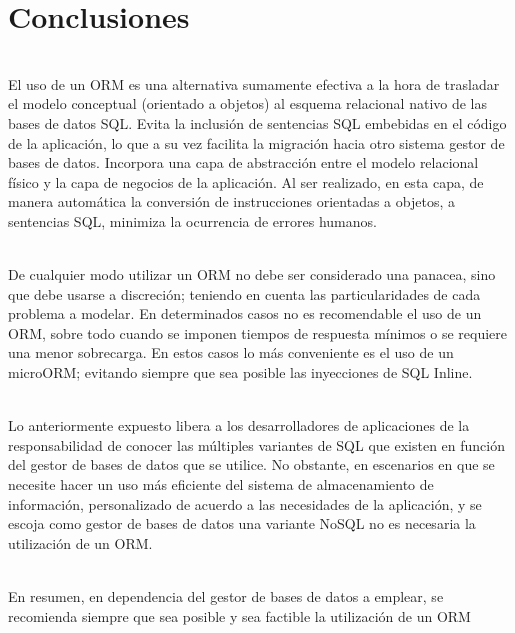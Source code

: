 \section{Conclusiones} 
\begin{flushleft}
\begin{itemize}
\textbf{}\\
El uso de un ORM es una alternativa sumamente efectiva a la hora de trasladar el modelo conceptual
(orientado a objetos) al esquema relacional nativo de las bases de datos SQL. Evita la inclusión de
sentencias SQL embebidas en el código de la aplicación, lo que a su vez facilita la migración hacia otro
sistema gestor de bases de datos. Incorpora una capa de abstracción entre el modelo relacional físico y
la capa de negocios de la aplicación. Al ser realizado, en esta capa, de manera automática la conversión
de instrucciones orientadas a objetos, a sentencias SQL, minimiza la ocurrencia de errores humanos.

\textbf{}\\
De cualquier modo utilizar un ORM no debe ser considerado una panacea, sino que debe usarse a
discreción; teniendo en cuenta las particularidades de cada problema a modelar. En determinados casos
no es recomendable el uso de un ORM, sobre todo cuando se imponen tiempos de respuesta mínimos o
se requiere una menor sobrecarga. En estos casos lo más conveniente es el uso de un microORM;
evitando siempre que sea posible las inyecciones de SQL Inline.

\textbf{}\\
Lo anteriormente expuesto libera a los desarrolladores de aplicaciones de la responsabilidad de conocer
las múltiples variantes de SQL que existen en función del gestor de bases de datos que se utilice. No
obstante, en escenarios en que se necesite hacer un uso más eficiente del sistema de almacenamiento
de información, personalizado de acuerdo a las necesidades de la aplicación, y se escoja como gestor de
bases de datos una variante NoSQL no es necesaria la utilización de un ORM. 

\textbf{}\\
En resumen, en dependencia del gestor de bases de datos a emplear, se recomienda siempre que sea
posible y sea factible la utilización de un ORM


\end{itemize} 


\end{flushleft}